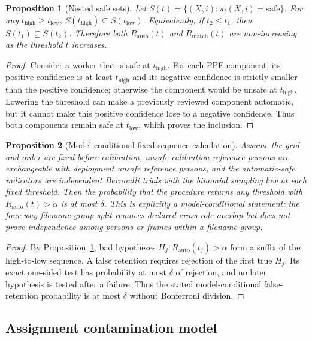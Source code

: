 \documentclass[iicol,pdflatex,sn-mathphys-num]{sn-jnl}
\newtheorem{proposition}{Proposition}
\begin{document}
\begin{proposition}[Nested safe sets]\label{prop:monotone}
Let $S(t)=\{(X,i):\pi_t(X,i)=\mathrm{safe}\}$. For any $t_{\mathrm{high}}\geq t_{\mathrm{low}}$, $S(t_{\mathrm{high}})\subseteq S(t_{\mathrm{low}})$. Equivalently, if $t_2\leq t_1$, then $S(t_1)\subseteq S(t_2)$. Therefore both $R_{\mathrm{auto}}(t)$ and $R_{\mathrm{match}}(t)$ are non-increasing as the threshold $t$ increases.
\end{proposition}

\begin{proof}
Consider a worker that is safe at $t_{\mathrm{high}}$. For each PPE component, its positive confidence is at least $t_{\mathrm{high}}$ and its negative confidence is strictly smaller than the positive confidence; otherwise the component would be unsafe at $t_{\mathrm{high}}$. Lowering the threshold can make a previously reviewed component automatic, but it cannot make this positive confidence lose to a negative confidence. Thus both components remain safe at $t_{\mathrm{low}}$, which proves the inclusion.
\end{proof}

\begin{proposition}[Model-conditional fixed-sequence calculation]\label{prop:ordered}
Assume the grid and order are fixed before calibration, unsafe calibration reference persons are exchangeable with deployment unsafe reference persons, and the automatic-safe indicators are independent Bernoulli trials with the binomial sampling law at each fixed threshold. Then the probability that the procedure returns any threshold with $R_{\mathrm{auto}}(t)>\alpha$ is at most $\delta$. This is explicitly a model-conditional statement: the four-way filename-group split removes declared cross-role overlap but does not prove independence among persons or frames within a filename group.
\end{proposition}

\begin{proof}
By Proposition~\ref{prop:monotone}, bad hypotheses $H_j:R_{\mathrm{auto}}(t_j)>\alpha$ form a suffix of the high-to-low sequence. A false retention requires rejection of the first true $H_j$. Its exact one-sided test has probability at most $\delta$ of rejection, and no later hypothesis is tested after a failure. Thus the stated model-conditional false-retention probability is at most $\delta$ without Bonferroni division.
\end{proof}

\subsection{Assignment contamination model}
\end{document}
